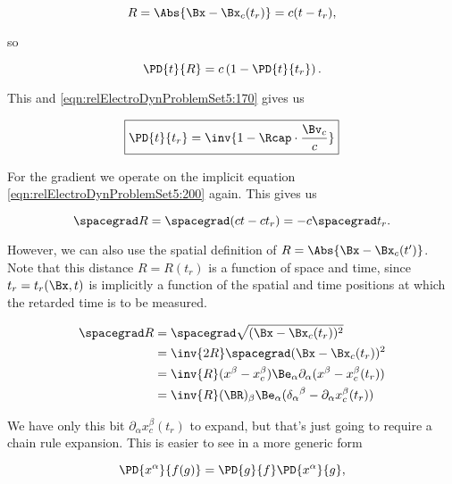 \begin{equation}\label{eqn:relElectroDynProblemSet5:200}
R = \Abs{\Bx - \Bx_c(t_r)} = c(t - t_r),
\end{equation}

so 

\begin{equation}\label{eqn:relElectroDynProblemSet5:220}
\PD{t}{R} = c\left(1 - \PD{t}{t_r}\right).
\end{equation}

This and \ref{eqn:relElectroDynProblemSet5:170} gives us

\begin{equation}\label{eqn:relElectroDynProblemSet5:240}
\boxed{
\PD{t}{t_r} = \inv{ 1 -\Rcap \cdot \frac{\Bv_c}{c} }
}
\end{equation}

For the gradient we operate on the implicit equation \ref{eqn:relElectroDynProblemSet5:200} again.  This gives us

\begin{equation}\label{eqn:relElectroDynProblemSet5:300}
\spacegrad R = \spacegrad (c t - c t_r) = - c \spacegrad t_r.
\end{equation}

However, we can also use the spatial definition of $R = \Abs{\Bx - \Bx_c(t')}$.  Note that this distance $R = R(t_r)$ is a function of space and time, since $t_r = t_r(\Bx, t)$ is implicitly a function of the spatial and time positions at which the retarded time is to be measured.

\begin{align*}
\spacegrad R 
&=
\spacegrad \sqrt{(\Bx - \Bx_c(t_r))^2} \\
&=
\inv{2R} \spacegrad (\Bx - \Bx_c(t_r))^2 \\
&=
\inv{R} (x^\beta - x_c^\beta) \Be_\alpha \partial_\alpha (x^\beta - x_c^\beta(t_r)) \\
&=
\inv{R} (\BR)_\beta \Be_\alpha ({\delta_\alpha}^\beta - \partial_\alpha x_c^\beta(t_r)) \\
\end{align*}

We have only this bit $\partial_\alpha x_c^\beta(t_r)$ to expand, but that's just going to require a chain rule expansion.  This is easier to see in a more generic form

\begin{equation}\label{eqn:relElectroDynProblemSet5:320}
\PD{x^\alpha}{f(g)} = \PD{g}{f} \PD{x^\alpha}{g},
\end{equation}

